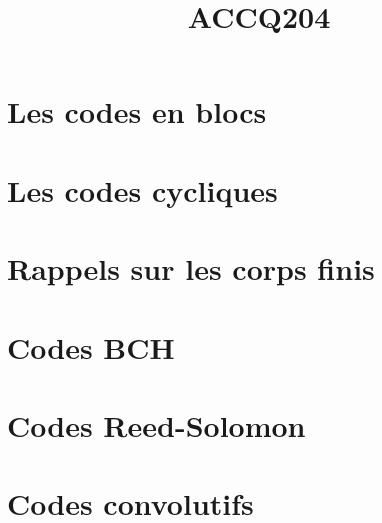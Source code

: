 \documentclass[a4paper,9pt]{article}
\title{\vspace{-1.2cm} \textbf{ACCQ204}}
\begin{document}
\maketitle

\vspace{-1.5cm}

\section{Les codes en blocs}

	

\section{Les codes cycliques}

	

\section{Rappels sur les corps finis}

	

\section{Codes BCH}

	

\section{Codes Reed-Solomon}

	

\section{Codes convolutifs}

	
\end{document}

